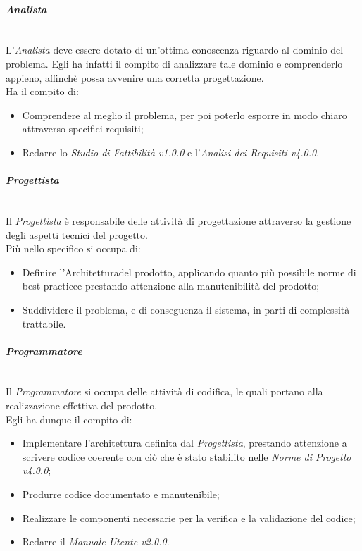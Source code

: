 \paragraph{\textit{Analista}} ~\\
	L'\textit{Analista} deve essere dotato di un'ottima conoscenza riguardo al dominio del problema. Egli ha infatti il 					compito di analizzare tale dominio e comprenderlo appieno, affinchè possa avvenire una corretta 											progettazione\glossario.\\
	Ha il compito di:
	\begin{itemize}
	\item Comprendere al meglio il problema, per poi poterlo esporre in modo chiaro attraverso specifici 									requisiti\glossario;
	\item Redarre lo \textit{Studio di Fattibilità v1.0.0} e l'\textit{Analisi dei Requisiti v4.0.0}.
	\end{itemize}

\paragraph{\textit{Progettista}} ~\\
	Il \textit{Progettista} è responsabile delle attività di progettazione attraverso la gestione degli aspetti tecnici 	del progetto.\\
	Più nello specifico si occupa di:
	\begin{itemize}
	\item Definire l'Architettura\glossario del prodotto\glossario, applicando quanto più possibile norme di 							best practice\glossario e prestando attenzione alla manutenibilità del prodotto;
	\item Suddividere il problema, e di conseguenza il sistema, in parti di complessità trattabile.
	\end{itemize}

\paragraph{\textit{Programmatore}} ~\\
	Il \textit{Programmatore} si occupa delle attività di codifica, le quali portano alla realizzazione effettiva del 						prodotto.\\
	Egli ha dunque il compito di:
	\begin{itemize}
	\item Implementare l'architettura definita dal \textit{Progettista}, prestando attenzione a scrivere codice 						coerente con ciò che è stato stabilito nelle \textit{Norme di Progetto v4.0.0};
	\item Produrre codice documentato e manutenibile;
	\item Realizzare le componenti necessarie per la verifica e la validazione del codice;
	\item Redarre il \textit{Manuale Utente v2.0.0}.
	\end{itemize}

